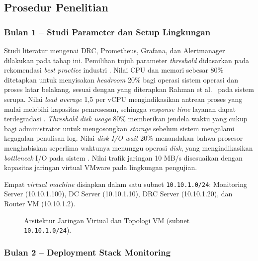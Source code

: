 \documentclass[10pt,twocolumn]{article}
\begin{document}
\subsection{Prosedur Penelitian}

\subsubsection{Bulan 1 -- Studi Parameter dan Setup Lingkungan}

Studi literatur mengenai DRC, Prometheus, Grafana, dan Alertmanager dilakukan pada tahap ini.
Pemilihan tujuh parameter \textit{threshold} didasarkan pada rekomendasi \textit{best practice}
industri \cite{turnbull2018,pivotto2023}. Nilai CPU dan memori sebesar 80\% ditetapkan untuk
menyisakan \textit{headroom} 20\% bagi operasi sistem operasi dan proses latar belakang, sesuai
dengan yang diterapkan Rahman et al.\ \cite{Rahman2020} pada sistem serupa. Nilai \textit{load
average} 1,5 per vCPU mengindikasikan antrean proses yang mulai melebihi kapasitas pemrosesan,
sehingga \textit{response time} layanan dapat terdegradasi \cite{turnbull2018}. \textit{Threshold
disk usage} 80\% memberikan jendela waktu yang cukup bagi administrator untuk mengosongkan
\textit{storage} sebelum sistem mengalami kegagalan penulisan log. Nilai \textit{disk I/O wait} 20\%
menandakan bahwa prosesor menghabiskan seperlima waktunya menunggu operasi \textit{disk}, yang
mengindikasikan \textit{bottleneck} I/O pada sistem \cite{turnbull2018}. Nilai trafik jaringan 10
MB/s disesuaikan dengan kapasitas jaringan virtual VMware pada lingkungan pengujian.

Empat \textit{virtual machine} disiapkan dalam satu subnet \texttt{10.10.1.0/24}: Monitoring Server
(10.10.1.100), DC Server (10.10.1.10), DRC Server (10.10.1.20), dan Router VM (10.10.1.2).

\begin{figure}[H]
  \centering
  \caption{Arsitektur Jaringan Virtual dan Topologi VM (subnet \texttt{10.10.1.0/24}).}
  \label{fig:arsitektur-jaringan}
\end{figure}

\subsubsection{Bulan 2 -- Deployment Stack Monitoring}
\end{document}
